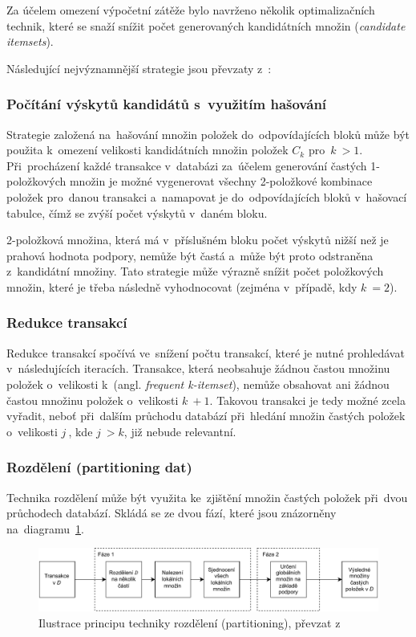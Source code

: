Za účelem omezení výpočetní zátěže bylo navrženo několik optimalizačních technik, které se snaží snížit počet generovaných kandidátních množin (\textit{candidate itemsets}). 

Následující nejvýznamnější strategie jsou převzaty z~\cite{HanAprioriOpti2012}:
\subsubsection{Počítání výskytů kandidátů s~využitím hašování } 
Strategie založená na~hašování množin položek do~odpovídajících bloků může být použita k~omezení velikosti kandidátních množin položek \( C_k \) pro~\( k~> 1 \). Při~procházení každé transakce v~databázi za~účelem generování častých 1-položkových množin je možné vygenerovat všechny 2-položkové kombinace položek pro~danou transakci a~namapovat je do~odpovídajících bloků v~hašovací tabulce, čímž se zvýší počet výskytů v~daném bloku.

2-položková množina, která má v~příslušném bloku počet výskytů nižší než je prahová hodnota podpory, nemůže být častá a~může být proto odstraněna z~kandidátní množiny. Tato strategie může výrazně snížit počet položkových množin, které je třeba následně vyhodnocovat (zejména v~případě, kdy \( k~= 2 \)).

\subsubsection{Redukce transakcí}
Redukce transakcí  spočívá ve~snížení počtu transakcí, které je nutné prohledávat v~následujících iteracích. Transakce, která neobsahuje žádnou častou množinu položek o~velikosti k~(angl. \textit{frequent k-itemset}), nemůže obsahovat ani žádnou častou množinu položek o~velikosti \( k~+ 1 \). Takovou transakci je tedy možné zcela vyřadit, neboť při~dalším průchodu databází při~hledání množin častých položek o~velikosti \( j~\), kde \( j~> k\), již nebude relevantní.


\subsubsection{Rozdělení (partitioning dat)}  
Technika rozdělení může být využita ke~zjištění množin častých položek při~dvou průchodech databází. Skládá se ze dvou fází, které jsou znázorněny na~diagramu~\ref{fig:partitioning_diagram}.

\begin{figure}[H]
	\centering
	\includegraphics[width=\textwidth]{obrazky-figures/AproiriPart.drawio-crop.pdf}
    \caption{Ilustrace principu techniky rozdělení (partitioning), převzat z~\cite{HanAprioriOpti2012}}
    \label{fig:partitioning_diagram}
\end{figure}


